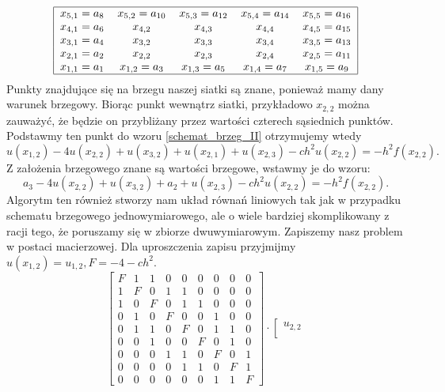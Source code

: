 \documentclass[12pt,a4paper]{report}
\begin{document}
\begin{problem}
\begin{example}
\begin{align*}
\begin{tabular}{|ccccc|}
\hline
$ x_{5,1}=a_8$ & $x_{5,2}=a_{10}$ & $x_{5,3}=a_{12}$ & $x_{5,4}=a_{14}$ &$ x_{5,5}=a_{16}$ \\
$x_{4,1} = a_6$ &$ x_{4,2}$ & $x_{4,3}$ & $x_{4,4}$ & $x_{4,5} = a_{15}$ \\
$x_{3,1} = a_4$ & $x_{3,2}$ & $x_{3,3}$ & $x_{3,4}$ & $x_{3,5} = a_{13}$ \\
$x_{2,1} = a_2$ & $x_{2,2}$ & $x_{2,3}$ & $x_{2,4}$ & $x_{2,5} = a_{11}$ \\
$x_{1,1} = a_1$ &$x_{1,2}=a_3$ & $x_{1,3}=a_5$ & $x_{1,4}=a_7$ & $x_{1,5} = a_{9}$ \\
\hline
\end{tabular}
\end{align*}
Punkty znajdujące się na brzegu naszej siatki są znane, ponieważ mamy dany warunek brzegowy. Biorąc punkt wewnątrz siatki, przykładowo $x_{2,2}$ można zauważyć, że będzie on przybliżany przez wartości czterech sąsiednich punktów. Podstawmy ten punkt do wzoru \eqref{schemat_brzeg_II} otrzymujemy wtedy
$$
u(x_{1,2}) - 4u(x_{2,2}) + u(x_{3,2}) + u(x_{2,1}) + u(x_{2,3}) - ch^2u(x_{2,2}) = -h^2f(x_{2,2}).
$$
Z założenia brzegowego znane są wartości brzegowe, wstawmy je do wzoru:
$$
a_3 - 4u(x_{2,2}) + u(x_{3,2}) + a_2 + u(x_{2,3}) - ch^2u(x_{2,2}) = -h^2f(x_{2,2}).
$$
Algorytm ten również stworzy nam układ równań liniowych tak jak w przypadku schematu brzegowego jednowymiarowego, ale o wiele bardziej skomplikowany z racji tego, że poruszamy się w zbiorze dwuwymiarowym. Zapiszemy nasz problem w postaci macierzowej. Dla uproszczenia zapisu przyjmijmy $u(x_{1,2}) = u_{1,2}, F= -4-ch^2$.
$$
\left[ \begin{array}{ccccccccc}
F & 1 & 1 & 0 & 0 & 0& 0 & 0 & 0\\
1 & F & 0 & 1 & 1 & 0 & 0 & 0 & 0 \\
1 & 0 & F & 0 & 1 & 1& 0 & 0 & 0 \\
0 & 1 & 0 & F & 0& 0 & 1 & 0 & 0  \\ 
0 & 1 & 1& 0 & F & 0& 1 & 1 & 0 \\
0 & 0 & 1 & 0 & 0 & F & 0 & 1 & 0 \\
0 & 0 & 0 & 1 & 1 & 0 & F & 0 & 1 \\
0 & 0 & 0 & 0 & 1 & 1 & 0 & F & 1 \\
0 & 0 & 0 & 0 & 0 & 0 & 1 & 1 & F
\end{array} \right] \cdot
\left[ \begin{array}{c}
u_{2,2} \\

\end{array}$$
\end{example}
\end{problem}
\end{document}
